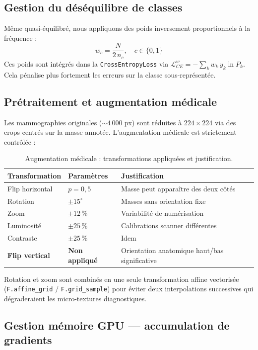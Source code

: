 \documentclass[a4paper,11pt]{article}
\begin{document}
\subsection{Gestion du déséquilibre de classes}

Même quasi-équilibré, nous appliquons des poids inversement proportionnels à la fréquence :
\[
  w_c = \frac{N}{2\,n_c}, \quad c \in \{0,1\}
\]
Ces poids sont intégrés dans la \texttt{CrossEntropyLoss} via
$\mathcal{L}_{CE}^w = -\sum_k w_k\,y_k\ln P_k$.
Cela pénalise plus fortement les erreurs sur la classe sous-représentée.

\subsection{Prétraitement et augmentation médicale}

Les mammographies originales ($\sim 4\,000$ px) sont réduites à $224\times224$ via
des crops centrés sur la masse annotée.
L'augmentation médicale est strictement contrôlée :

\begin{table}[H]
\centering
\caption{Augmentation médicale : transformations appliquées et justification.}
\begin{tabular}{lll}
\toprule
\textbf{Transformation} & \textbf{Paramètres} & \textbf{Justification} \\
\midrule
Flip horizontal       & $p=0{,}5$          & Masse peut apparaître des deux côtés \\
Rotation              & $\pm 15^\circ$      & Masses sans orientation fixe \\
Zoom                  & $\pm12\,\%$         & Variabilité de numérisation \\
Luminosité            & $\pm25\,\%$         & Calibrations scanner différentes \\
Contraste             & $\pm25\,\%$         & Idem \\
\textbf{Flip vertical} & \textbf{Non appliqué} & Orientation anatomique haut/bas significative \\
\bottomrule
\end{tabular}
\end{table}

Rotation et zoom sont combinés en une seule transformation affine vectorisée
(\texttt{F.affine\_grid} / \texttt{F.grid\_sample}) pour éviter deux interpolations
successives qui dégraderaient les micro-textures diagnostiques.

\subsection{Gestion mémoire GPU — accumulation de gradients}
\end{document}
